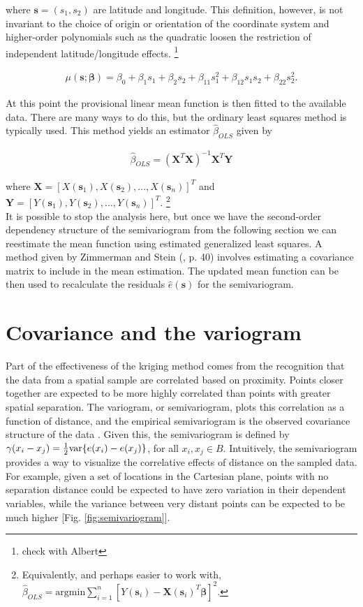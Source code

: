 \documentclass[12pt,twoside]{reedthesis}
\begin{document}
where $\mathbf{s} = (s_1, s_2)$ are latitude and longitude. This definition, however, is not invariant to the choice of origin or orientation of the coordinate system \cite{gelfand:2010} and higher-order polynomials such as the quadratic loosen the restriction of independent latitude/longitude effects. \footnote{check with Albert}

\begin{align*}
\mu(\mathbf{s}; \mathbf{\beta}) = \beta_0 + \beta_1s_1 + \beta_2s_2 + \beta_{11}s_1^2 + \beta_{12}s_1s_2 + \beta_{22}s_2^2.
\end{align*} 

At this point the provisional linear mean function is then fitted to the available data. There are many ways to do this, but the ordinary least squares method is typically used. This method yields an estimator $\hat\beta_{OLS}$ given by 

\begin{align*}
\hat\beta_{OLS} = (\mathbf{X}^T\mathbf{X})^{-1}\mathbf{X}^T\mathbf{Y} 
\end{align*} 

where $\mathbf{X} = [X(\mathbf{s}_1), X(\mathbf{s}_2), \dots, X(\mathbf{s}_n)]^T$ and $\mathbf{Y} = [Y(\mathbf{s}_1), Y(\mathbf{s}_2), \dots, Y(\mathbf{s}_n)]^T$. \footnote{Equivalently, and perhaps easier to work with, $\hat\beta_{OLS} = \text{argmin}\sum_{i=1}^n[Y(\mathbf{s}_i) - \mathbf{X}(\mathbf{s}_i)^T\mathbf{\beta}]^2$.} \\

It is possible to stop the analysis here, but once we have the second-order dependency structure of the semivariogram from the following section we can reestimate the mean function using estimated generalized least squares. A method given by Zimmerman and Stein (\cite{gelfand:2010}, p. 40) involves estimating a covariance matrix to include in the mean estimation. The updated mean function can be then used to recalculate the residuals $\hat e(\mathbf{s})$ for the semivariogram.


\section{Covariance and the variogram}
Part of the effectiveness of the kriging method comes from the recognition that the data from a spatial sample are correlated based on proximity. Points closer together are expected to be more highly correlated than points with greater spatial separation. The variogram, or semivariogram, plots this correlation as a function of distance, and the empirical semivariogram is the observed covariance structure of the data \cite{gelfand:2010}. Given this, the semivariogram is defined by $\gamma(x_i - x_j) = {1\over 2} \text{var} \{ e(x_i) - e(x_j) \}$, for all $x_i, x_j \in B$. Intuitively, the semivariogram provides a way to visualize the correlative effects of distance on the sampled data. For example, given a set of locations in the Cartesian plane, points with no separation distance could be expected to have zero variation in their dependent variables, while the variance between very distant points can be expected to be much higher [Fig. \ref{fig:semivariogram}]. \\
\end{document}
